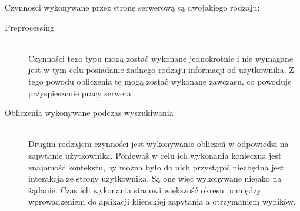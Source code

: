 Czynności wykonywane przez stronę serwerową są dwojakiego rodzaju:

\begin{description}
  \item[Preprocessing] \hfill \\
	Czynności tego typu mogą zostać wykonane jednokrotnie i nie wymagane jest w tym celu posiadanie żadnego rodzaju informacji od użytkownika. Z tego powodu obliczenia te mogą zostać wykonane zawczasu, co powoduje przyspieszenie pracy serwera.
  \item[Obliczenia wykonywane podczas wyszukiwania] \hfill \\
  Drugim rodzajem czynności jest wykonywanie obliczeń w odpowiedzi na zapytanie użytkownika. Ponieważ w celu ich wykonania konieczna jest znajomość kontekstu, by można było do nich przystąpić niezbędna jest interakcja ze strony użytkownika. Są one więc wykonywane niejako na żądanie. Czas ich wykonania stanowi większość okresu pomiędzy wprowadzeniem do aplikacji klienckiej zapytania a otrzymaniem wyników. 

\end{description}

